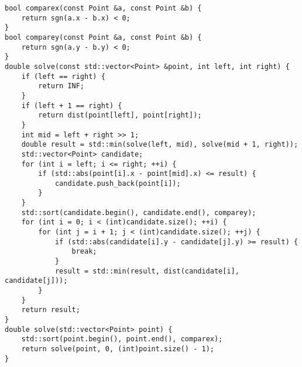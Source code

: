 \begin{lstlisting}
bool comparex(const Point &a, const Point &b) {
    return sgn(a.x - b.x) < 0;
}
bool comparey(const Point &a, const Point &b) {
    return sgn(a.y - b.y) < 0;
}
double solve(const std::vector<Point> &point, int left, int right) {
    if (left == right) {
        return INF;
    }
    if (left + 1 == right) {
        return dist(point[left], point[right]);
    }
    int mid = left + right >> 1;
    double result = std::min(solve(left, mid), solve(mid + 1, right));
    std::vector<Point> candidate;
    for (int i = left; i <= right; ++i) {
        if (std::abs(point[i].x - point[mid].x) <= result) {
            candidate.push_back(point[i]);
        }
    }
    std::sort(candidate.begin(), candidate.end(), comparey);
    for (int i = 0; i < (int)candidate.size(); ++i) {
        for (int j = i + 1; j < (int)candidate.size(); ++j) {
            if (std::abs(candidate[i].y - candidate[j].y) >= result) {
                break;
            }
            result = std::min(result, dist(candidate[i], candidate[j]));
        }
    }
    return result;
}
double solve(std::vector<Point> point) {
    std::sort(point.begin(), point.end(), comparex);
    return solve(point, 0, (int)point.size() - 1);
}
\end{lstlisting}
